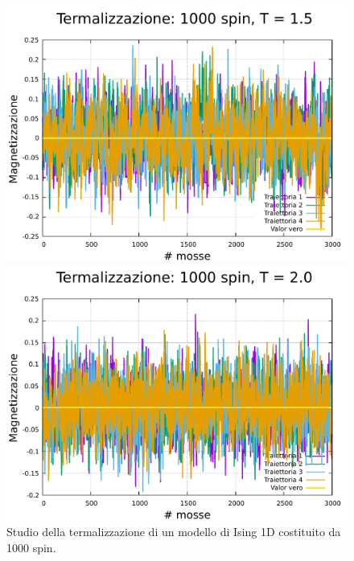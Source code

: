 \begin{figure}[htbp]
    \begin{minipage}{0.45\textwidth}  
      \centering
      \includegraphics[page=1, width=\textwidth]{Immagini/simIsing1D/magn0.0/term/term_1000_1.5.pdf}
      \caption{$T\,=\,1.5$}
    \end{minipage}\hfill
    \begin{minipage}{0.45\textwidth}  
      \centering
      \includegraphics[page=1, width=\textwidth]{Immagini/simIsing1D/magn0.0/term/term_1000_2.0.pdf}
      \caption{$T\,=\,2.0$}
    \end{minipage}
    \caption{Studio della termalizzazione di un modello di Ising 1D costituito da 1000 spin.}
\end{figure}

